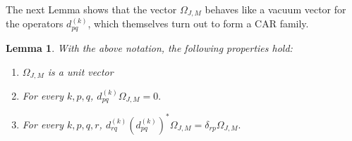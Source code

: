 \documentclass[10pt,a4paper]{amsart}
\newtheorem{lemma}{Lemma}
\begin{document}
The next Lemma shows that the vector $\Omega_{J,M}$ behaves like a vacuum vector for the operators $d_{pq}^{(k)}$, which themselves turn out to form a CAR family.

\begin{lemma} \label{lemma:propertiesOfOmega}
    With the above notation, the following properties hold: 
    \begin{enumerate}[label={\rm(\roman*)}]
    \item $\Omega_{J,M}$ is a unit vector 
    \item For every \(k,p,q\), \(
    d^{(k)}_{pq}\Omega_{J,M}=0. \) 
    \item For every \(k,p,q,r\), \(
    d^{(k)}_{rq}(d^{(k)}_{pq})^*\Omega_{J,M}
    =
    \delta_{rp}\Omega_{J,M}.
    \)
    \end{enumerate}
\end{lemma}
\end{document}
